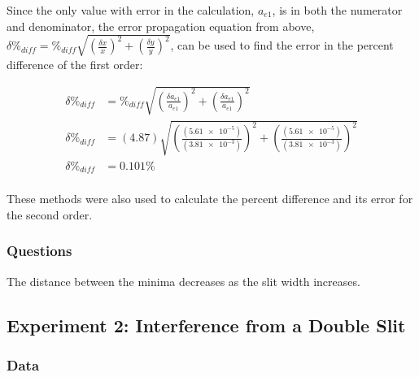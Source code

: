 \documentclass[12pt]{article}
\begin{document}
Since the only value with error in the calculation, \(a_{e1}\), is in both the
numerator and denominator, the error propagation equation from above,
\(\delta \%_{diff} = \%_{diff} \sqrt{\left( \frac{\delta x}{x} \right) ^2 +
  \left( \frac{\delta y}{y} \right) ^2 } \), can be used to find the error in
the percent difference of the first order:

\begin{align*}
  \delta \%_{diff} &= \%_{diff} \sqrt{\left( \frac{\delta a_{e1}}{a_{e1}}
                     \right) ^2 + \left( \frac{\delta a_{e1}}{a_{e1}} \right )
                     ^2} \\
  \delta \%_{diff} &= (4.87) \sqrt{\left(
                     \frac{(\num{5.61e-5})}{(\num{3.81e-3})} \right) ^2 +
                     \left( \frac{(\num{5.61e-5})}{(\num{3.81e-3})} \right) ^2}
  \\
  \delta \%_{diff} &= \num{0.101} \% \\
\end{align*}

These methods were also used to calculate the percent difference and its error for
the second order.

\subsubsection{Questions}

\subsubsubsection{}

\qq The distance between the minima decreases as the slit width increases.



\subsection{Experiment 2: Interference from a Double Slit}

\subsubsection{Data}
\end{document}
